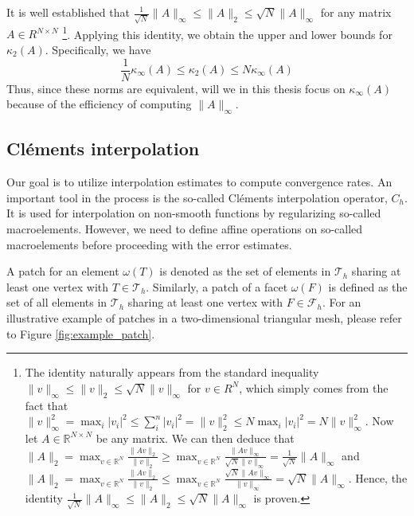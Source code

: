 \documentclass[11pt]{article}
\theoremstyle{remark}
\newcommand{\abs}[1]{\left\lvert #1 \right\rvert}
\renewcommand{\le}{\leqslant}
\renewcommand{\ge}{\geqslant}
\numberwithin{equation}{section}
\begin{document}
It is well established that $ \frac{1}{\sqrt{N} }  \| A \|_{ \infty }^{  }  \le \| A \|_{2  }^{  } \le
\sqrt{N}  \| A \|_{\infty  }^{  }  $ for any matrix $A \in R^{N\times N}$  \footnote{
    The identity naturally appears from the standard inequality $\| v \|_{ \infty }^{  } \le  \| v \|_{2  }^{  } \le \sqrt{N}  \| v \|_{ \infty }^{  }   $ for $v \in R^{N}$, which simply comes from the fact that  $ \| v \|_{\infty  }^{ 2 } = \max_{i} \abs{ v_{i} }^{2} \le \sum_{i}^{n}   \abs{ v_{i} }^{2} = \| v \|_{ 2 }^{2  } \le N      \max_{i} \abs{ v_{i} }^{2} = N \| v \|_{
    \infty}^{ 2 }$. Now let $A\in \mathbb{R} ^{N \times N}$ be any matrix. We can then deduce that $ \| A \|_{ 2 }^{  } = \max_{v \in \mathbb{R} ^{N}} \frac{\| Av \|_{2  }^{  }}{\| v \|_{ 2 }^{  } } \ge \max_{v \in \mathbb{R} ^{N}}
    \frac{\| Av \|_{ \infty  }^{  }}{ \sqrt{N} \| v \|_{ \infty}^{  } } = \frac{1}{ \sqrt{N} } \| A \|_{ \infty }^{  }    $ and $ \| A \|_{ 2 }^{  } = \max_{v \in \mathbb{R} ^{N}} \frac{\| Av \|_{2  }^{  }}{\| v \|_{ 2 }^{  } } \le  \max_{v \in \mathbb{R} ^{N}}
    \frac{\sqrt{N} \| Av \|_{ \infty  }^{  }}{  \| v \|_{ \infty}^{  } } =  \sqrt{N} \| A \|_{ \infty }^{  }    $. Hence, the identity $\frac{1}{\sqrt{N} } \| A \|_{\infty  }^{  } \le \| A \|_{ 2 }^{  }\le \sqrt{N} \| A \|_{ \infty  }^{  }   $  is proven.

}. Applying this identity, we obtain the upper and lower bounds for $\kappa_{2}(A)$. Specifically, we have
\begin{equation}
\frac{1}{N} \kappa_{\infty} ( A) \le  \kappa_{2} ( A) \le N \kappa _{\infty}(A)
\end{equation}
Thus, since these norms are equivalent, will we in this thesis focus on $ \kappa_{\infty}( A)  $ because of the efficiency of computing $\| A \|_{ \infty }^{  } $.

\subsection{Cléments interpolation}%
\label{ssub:clement_operator}
Our goal is to utilize interpolation estimates to compute convergence rates. An important tool in the process is the so-called Cléments interpolation operator, $C_{h}$.
It is used for interpolation on non-smooth functions by regularizing so-called macroelements. However, we need to define affine operations on so-called macroelements before proceeding with the error estimates.

A patch for an element $\omega \left( T \right) $ is denoted as the set of elements in $\mathcal{T} _{h}$  sharing at least one vertex with $T \in \mathcal{T} _{h}$. Similarly,  a patch of a facet $\omega \left( F \right) $ is defined as the set of all elements in $\mathcal{T}_{h} $
sharing at least one vertex with $F \in  \mathcal{F} _{h}$. For an illustrative example of patches in a two-dimensional triangular mesh, please refer to Figure \ref{fig:example_patch}.
\end{document}
